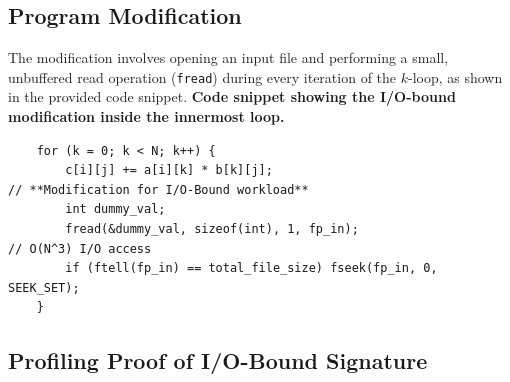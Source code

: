 \documentclass[11pt, a4paper]{article}
\begin{document}
\subsection{Program Modification}
The modification involves opening an input file and performing a small, unbuffered read operation (\texttt{fread}) during every iteration of the $k$-loop, as shown in the provided code snippet.
\noindent\textbf{Code snippet showing the I/O-bound modification inside the innermost loop.}
\begin{verbatim}
    for (k = 0; k < N; k++) {
        c[i][j] += a[i][k] * b[k][j];
// **Modification for I/O-Bound workload**
        int dummy_val;
        fread(&dummy_val, sizeof(int), 1, fp_in);
// O(N^3) I/O access
        if (ftell(fp_in) == total_file_size) fseek(fp_in, 0, SEEK_SET);
    }
\end{verbatim}


\subsection{Profiling Proof of I/O-Bound Signature}
\end{document}
